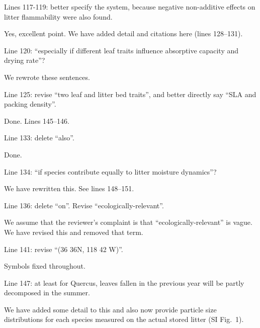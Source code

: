 \documentclass[letterpaper, 12pt]{letter}
\begin{document}
\begin{letter}{}
\begin{quoting}
  Lines 117-119: better specify the system, because negative non-additive
  effects on litter flammability were also found.
\end{quoting}

Yes, excellent point. We have added detail and citations here (lines 128--131).

\begin{quoting}
  Line 120: “especially if different leaf traits influence absorptive capacity
  and drying rate”?
\end{quoting}

We rewrote these sentences.

\begin{quoting}
  Line 125: revise “two leaf and litter bed traits”, and better directly say
  “SLA and packing density”.
\end{quoting}

Done. Lines 145--146.

\begin{quoting}
  Line 133: delete “also”.
\end{quoting}

Done.

\begin{quoting}
  Line 134: “if species contribute equally to litter moisture dynamics”?
\end{quoting}

We have rewritten this. See lines 148--151.

\begin{quoting}
  Line 136: delete “on”. Revise “ecologically-relevant”.
\end{quoting}

We assume that the reviewer's complaint is that ``ecologically-relevant'' is
vague. We have revised this and removed that term.

\begin{quoting}
Line 141: revise “(36 36N, 118 42 W)”.
\end{quoting}

Symbols fixed throughout.

\begin{quoting}
  Line 147: at least for Quercus, leaves fallen in the previous year will be
  partly decomposed in the summer.
\end{quoting}

We have added some detail to this and also now provide particle size
distributions for each species measured on the actual stored litter (SI Fig.~1).


\end{letter}
\end{document}
